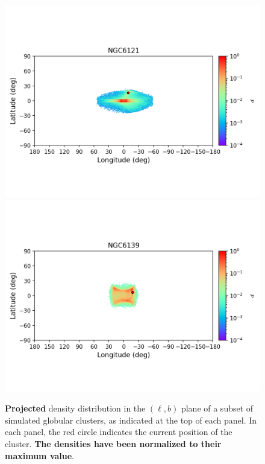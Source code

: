 \begin{figure}
        \includegraphics[clip=true, trim = 0mm 20mm 0mm 10mm, width=1\columnwidth]{images/error_plots_NGC6121.png}
        \includegraphics[clip=true, trim = 0mm 20mm 0mm 10mm, width=1\columnwidth]{images/error_plots_NGC6139.png}
        \caption[]{\textbf{Projected} density distribution in the $(\ell, b)$ plane of a subset of simulated globular clusters, as indicated at the top of each panel. In each panel, the red circle indicates the current position of the cluster. \textbf{The densities have been normalized to their maximum value}.}\label{stream7}
        \end{figure}
